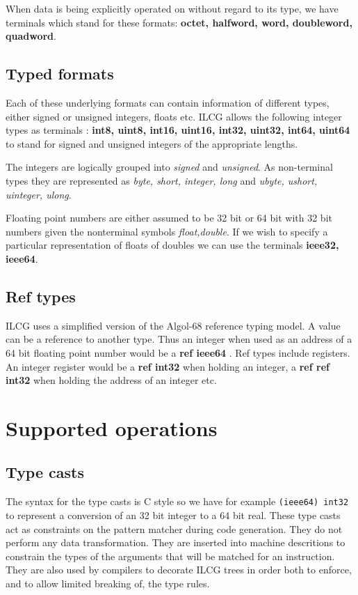 {{When data is being explicitly operated on without regard to its type, we have terminals which
stand for these formats: {\bf octet, halfword, word, doubleword, quadword}.
\subsection{Typed formats}
Each of these underlying formats can contain information of different types, either
signed or unsigned integers, floats etc.
ILCG allows the following integer types as terminals :{\bf
int8, uint8, int16, uint16, int32, uint32, int64, uint64 }to stand for signed and
unsigned integers of the appropriate lengths.

The integers are logically grouped into {\sl signed} and {\sl unsigned}.
As non-terminal types they are represented as 
{\sl byte, short, integer, long} and
{\sl ubyte, ushort, uinteger, ulong}.

Floating point numbers are either assumed to be 32 bit or 64 bit with 32 bit numbers
given the nonterminal symbols {\sl float,double}. If we wish to specify a particular
representation of floats of doubles we can use the terminals {\bf ieee32, ieee64}.



\subsection{Ref types}
ILCG uses a simplified version of the Algol-68 reference typing model.
A value can be a reference to another type. Thus an integer when used as
an address of a 64 bit floating point number would be a {\bf ref ieee64 }.
Ref types include registers. An integer register would be a {\bf ref int32}
when holding an integer, a {\bf ref ref int32} when holding the address
of an integer etc.
\section{Supported operations}
\subsection{Type casts}



The syntax for the type casts is C style so we have
for example {\tt (ieee64) int32} to represent a conversion
of an 32 bit integer to a 64 bit real. These type casts
act as constraints on the pattern matcher during code 
generation. They do not perform any data transformation.
They are inserted into machine descritions to constrain the
types of the arguments that will be matched for an instruction.
They are also used by compilers to decorate ILCG trees 
in order both to enforce, and to allow limited breaking of, the type rules. 

}}
